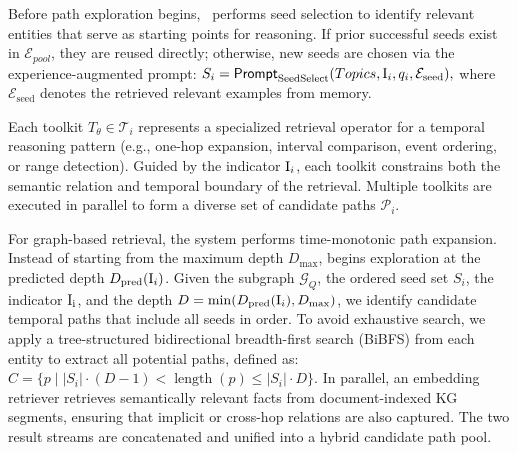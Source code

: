 



Before path exploration begins, \mot\ performs seed selection to identify relevant entities that serve as starting points for reasoning.  
If prior successful seeds exist in $\mathcal{E}_{pool}$, they are reused directly; otherwise, new seeds are chosen via the experience-augmented prompt:
$
S_i = \textsf{Prompt}_{\text{SeedSelect}}(Topics, \mathrm{I}_i, q_i, \mathcal{E}_{\text{seed}}),
$
where $\mathcal{E}_{\text{seed}}$ denotes the retrieved relevant examples  from memory.  

Each toolkit $T_\theta \in \mathcal{T}_i$ represents a specialized retrieval operator for a temporal reasoning pattern 
(e.g., one-hop expansion, interval comparison, event ordering, or range detection).  
Guided by the indicator $\mathrm{I}_i$, 
each toolkit constrains both the semantic relation and temporal boundary of the retrieval.  
Multiple toolkits are executed in parallel to form a diverse set of candidate paths $\mathcal{P}_i$. 

For graph-based retrieval, the system performs time-monotonic path expansion. 
Instead of starting from the maximum depth $D_{\max}$, \mot  begins exploration at the predicted depth $D_{\text{pred}}(\mathrm{I}_i)$. Given the subgraph $\mathcal{G}_Q$, the ordered seed set $S_i$, the indicator $\mathrm{I}_{\text{i}}$, and the depth $D = \min(D_{\text{pred}}(\mathrm{I}_i), D_{\max})$, we identify candidate temporal paths that include all seeds in order. To avoid exhaustive search, we apply a tree-structured  bidirectional breadth-first search (BiBFS) from each entity to extract all potential paths, defined as:
$
C = \{p \mid |S_i| \cdot (D{-}1) < \operatorname{length}(p) \leq |S_i| \cdot D\}.$
In parallel, an embedding retriever retrieves semantically relevant facts from document-indexed KG segments, 
ensuring that implicit or cross-hop relations are also captured.  
The two result streams are concatenated and unified into a hybrid candidate path pool. 

